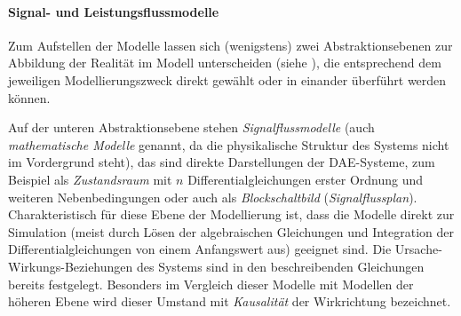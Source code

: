 \paragraph{Signal- und Leistungsflussmodelle} Zum Aufstellen der Modelle lassen sich (wenigstens) zwei Abstraktionsebenen zur Abbildung der Realität im Modell unterscheiden (siehe \cite{janschekSystementwurfMechatronischerSysteme2010}), die entsprechend dem jeweiligen Modellierungszweck direkt gewählt oder in einander überführt werden können. 

Auf der unteren Abstraktionsebene stehen \emph{Signalflussmodelle} (auch \emph{mathematische Modelle} genannt, da die physikalische Struktur des Systems nicht im Vordergrund steht), das sind direkte Darstellungen der DAE-Systeme, zum Beispiel als \emph{Zustandsraum} mit $n$ Differentialgleichungen erster Ordnung und weiteren Nebenbedingungen oder auch als \emph{Blockschaltbild} (\emph{Signalflussplan}). Charakteristisch für diese Ebene der Modellierung ist, dass die Modelle direkt zur Simulation (meist durch Lösen der algebraischen Gleichungen und Integration der Differentialgleichungen von einem Anfangswert aus) geeignet sind. Die Ursache-Wirkungs-Beziehungen des Systems sind in den beschreibenden Gleichungen bereits festgelegt. Besonders im Vergleich dieser Modelle mit Modellen der höheren Ebene wird dieser Umstand mit \emph{Kausalität} der Wirkrichtung bezeichnet.

